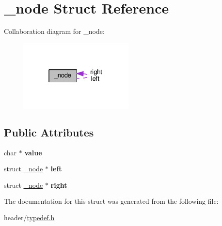 \hypertarget{struct__node}{}\section{\+\_\+node Struct Reference}
\label{struct__node}


Collaboration diagram for \+\_\+node\+:\nopagebreak
\begin{figure}[H]
\begin{center}
\leavevmode
\includegraphics[width=163pt]{struct__node__coll__graph}
\end{center}
\end{figure}
\subsection*{Public Attributes}
\begin{DoxyCompactItemize}
\item 
char $\ast$ {\bfseries value}\hypertarget{struct__node_a10fea5606d2e5925640c53baef7c10d9}{}\label{struct__node_a10fea5606d2e5925640c53baef7c10d9}

\item 
struct \hyperlink{struct__node}{\+\_\+node} $\ast$ {\bfseries left}\hypertarget{struct__node_ac655c71579c94517b53fbb59d99829bf}{}\label{struct__node_ac655c71579c94517b53fbb59d99829bf}

\item 
struct \hyperlink{struct__node}{\+\_\+node} $\ast$ {\bfseries right}\hypertarget{struct__node_a0958469df50896d9eb5dbaac2e7db7bb}{}\label{struct__node_a0958469df50896d9eb5dbaac2e7db7bb}

\end{DoxyCompactItemize}


The documentation for this struct was generated from the following file\+:\begin{DoxyCompactItemize}
\item 
header/\hyperlink{typedef_8h}{typedef.\+h}\end{DoxyCompactItemize}
